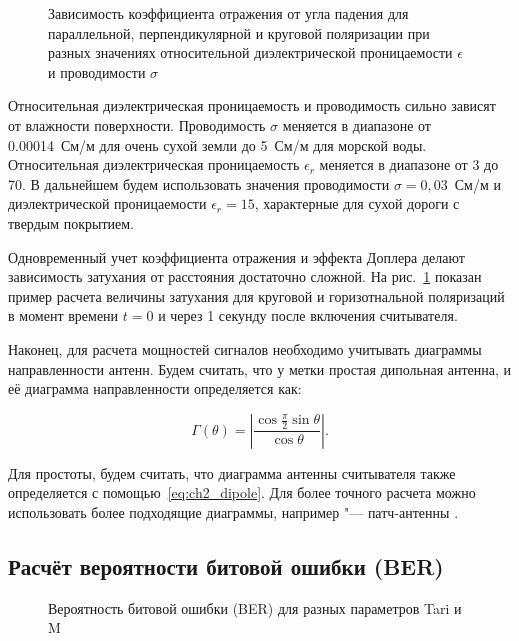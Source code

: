 \begin{figure}[h]
	\caption{Зависимость коэффициента отражения от угла падения для параллельной, перпендикулярной и круговой поляризации при разных значениях относительной диэлектрической проницаемости $\epsilon$ и проводимости $\sigma$}
	\label{fig:ch2_pathloss_3}
\end{figure}

Относительная диэлектрическая проницаемость и проводимость сильно зависят от влажности поверхности. Проводимость $\sigma$ меняется в диапазоне от 0.00014~См/м для очень сухой земли до 5~См/м для морской воды. Относительная диэлектрическая проницаемость $\epsilon_r$ меняется в диапазоне от 3 до 70. В дальнейшем будем использовать значения проводимости $\sigma = 0,03$~См/м и диэлектрической проницаемости $\epsilon_r = 15$, характерные для сухой дороги с твердым покрытием.

Одновременный учет коэффициента отражения и эффекта Доплера делают зависимость затухания от расстояния достаточно сложной. На рис.~\ref{fig:ch2_pathloss_3} показан пример расчета величины затухания для круговой и горизотнальной поляризаций в момент времени $t = 0$ и через 1 секунду после включения считывателя.

Наконец, для расчета мощностей сигналов необходимо учитывать диаграммы направленности антенн. Будем считать, что у метки простая дипольная антенна, и её диаграмма направленности определяется как:

\begin{equation}\label{eq:ch2_dipole}
	\Gamma(\theta) = \left|
		\frac{\cos{\frac{\pi}{2}\sin{\theta}}}{\cos{\theta}} \right|.
\end{equation}

Для простоты, будем считать, что диаграмма антенны считывателя также определяется с помощью~\eqref{eq:ch2_dipole}. Для более точного расчета можно использовать более подходящие диаграммы, например "--- патч-антенны \cite{Balanis2016}.




\subsection{Расчёт вероятности битовой ошибки (BER)}
\begin{figure}[h]
	\caption{Вероятность битовой ошибки (BER) для разных параметров Tari и M}
	\label{fig:ch2_ber}
\end{figure}

